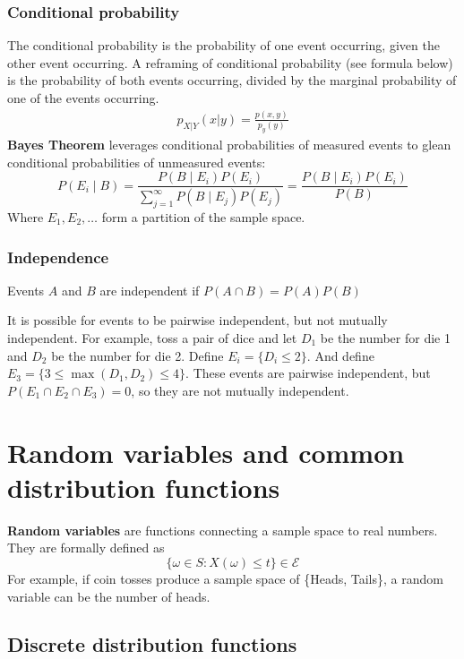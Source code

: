 \documentclass{article}
\begin{document}
\subsubsection{Conditional probability}
The conditional probability is the probability of one event occurring, given the other event occurring. A reframing of conditional probability (see formula below) is the probability of both events occurring, divided by the marginal probability of one of the events occurring. 
\begin{align*}
    p_{X|Y}(x|y) = \frac{p(x,y)}{p_y(y)}
\end{align*}
\textbf{Bayes Theorem} leverages conditional probabilities of measured events to glean conditional probabilities of unmeasured events:
\begin{equation*}
    P(E_i \mid B) = \frac{P(B \mid E_i)P(E_i)}{\sum_{j=1}^\infty P(B \mid E_j)P(E_j)} = \frac{P(B \mid E_i)P(E_i)}{P(B)}
\end{equation*}
Where $E_1, E_2, \dots$ form a partition of the sample space.

\subsubsection{Independence}
Events $A$ and $B$ are independent if $P(A\cap B) = P(A)P(B)$

It is possible for events to be pairwise independent, but not mutually independent. For example, toss a pair of dice and let $D_1$ be the number for die 1 and $D_2$ be the number for die 2. Define $E_i = \{D_i \leq 2\}$. And define $E_3 = \{ 3 \leq \max(D_1, D_2) \leq 4 \}$. These events are pairwise independent, but $P(E_1\cap E_2 \cap E_3) = 0$, so they are not mutually independent. 

\section{Random variables and common distribution functions}
\textbf{Random variables} are functions connecting a sample space to real numbers. They are formally defined as
\begin{equation*}
    \{ \omega \in S : X(\omega) \leq t \} \in \mathcal{E}
\end{equation*}
For example, if coin tosses produce a sample space of \{Heads, Tails\}, a random variable can be the number of heads. 

\subsection{Discrete distribution functions}
\end{document}
